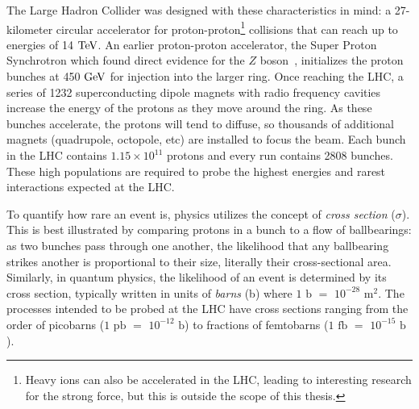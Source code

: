 The Large Hadron Collider was designed with these characteristics in mind: a 27-kilometer circular accelerator for proton-proton\footnote{Heavy ions can also be accelerated in the LHC, leading to interesting research for the strong force, but this is outside the scope of this thesis.} collisions that can reach up to energies of 14 $\rm{TeV}$. An earlier proton-proton accelerator, the Super Proton Synchrotron which found direct evidence for the $Z$ boson~\cite{Arnison:1983rp,Arnison:1983mk,Bagnaia:1983zx}, initializes the proton bunches at 450 $\rm{GeV}$ for injection into the larger ring. Once reaching the LHC, a series of 1232 superconducting dipole magnets with radio frequency cavities increase the energy of the protons as they move around the ring. As these bunches accelerate, the protons will tend to diffuse, so thousands of additional magnets (quadrupole, octopole, etc) are installed to focus the beam. Each bunch in the LHC contains $1.15\times10^{11}$ protons and every run contains 2808 bunches. These high populations are required to probe the highest energies and rarest interactions expected at the LHC.

To quantify how rare an event is, physics utilizes the concept of \textit{cross section} ($\sigma$). This is best illustrated by comparing protons in a bunch to a flow of ballbearings: as two bunches pass through one another, the likelihood that any ballbearing strikes another is proportional to their size, literally their cross-sectional area. Similarly, in quantum physics, the likelihood of an event is determined by its cross section, typically written in units of \textit{barns} (b) where $1$ $\mathrm{b}$ $=$ $10^{-28}$ $\mathrm{m}^2$. The processes intended to be probed at the LHC have cross sections ranging from the order of picobarns ($1$ $\mathrm{pb}$ $=$ $10^{-12}$ $\mathrm{b}$) to fractions of femtobarns ($1$ $\mathrm{fb}$ $=$ $10^{-15}$ $\mathrm{b}$).

